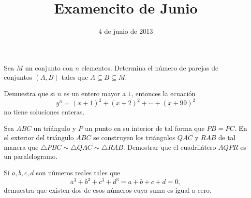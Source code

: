 \documentclass[fondo=green,onecolumn,12pt]{ommdoc}
\title{Examencito de Junio}
\date{4 de junio de 2013}
\begin{document}
\maketitle
\thispagestyle{empty}
\nonzeroparskip
\vspace{1cm}

\problema Sea $M$ un conjunto con $n$ elementos. Determina el número de parejas de conjuntos $(A,B)$ tales que $A\subseteq B\subseteq M$.

\problema Demuestra que si $n$ es un entero mayor a $1$, entonces la ecuación
\[
y^n = (x+1)^2 + (x+2)^2 + \cdots  + (x+99)^2 
\]
no tiene soluciones enteras.

\problema Sea $ABC$ un triángulo y $P$ un punto en su interior de tal forma que $PB=PC$. En el exterior del triángulo $ABC$ se construyen los triángulos $QAC$ y $RAB$ de tal manera que $\triangle PBC\sim \triangle QAC\sim \triangle RAB$. Demostrar que el cuadrilátero $AQPR$ es un paralelogramo.


\problema Si $a,b,c,d$ son números reales tales que
\[
a^3+b^3+c^3+d^3 = a+b+c+d = 0,
\]
demuestra que existen dos de esos números cuya suma es igual a cero.
\end{document}
